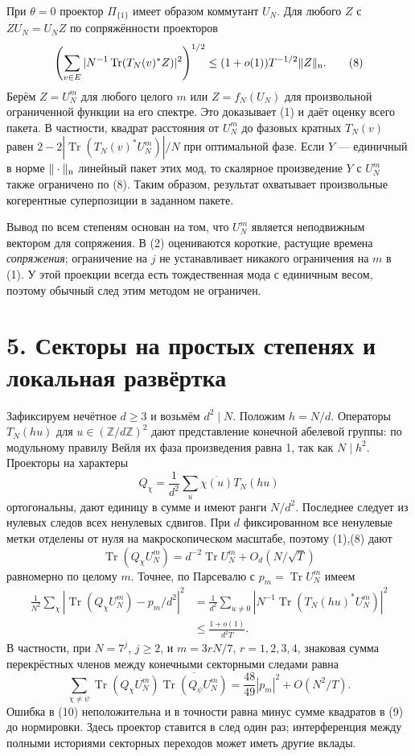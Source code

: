 \documentclass[11pt,a4paper]{article}
\newcommand{\Tr}{\operatorname{Tr}}
\newcommand{\Z}{\mathbb Z}
\newcommand{\sect}[1]{\section*{\sffamily\color{ink}#1}}
\begin{document}
При $\theta=0$ проектор $\Pi_{\{1\}}$ имеет образом коммутант $U_N$. Для любого $Z$ с $ZU_N=U_N Z$ по сопряжённости проекторов
\[
        \left(\sum_{v\in E}
               |N^{-1}\Tr(T_N(v)^*Z)|^2\right)^{1/2}
                          \le (1+o(1))T^{-1/2}\|Z\|_{\rm n}.        \tag{8}
\]
Берём $Z=U_N^m$ для любого целого $m$ или $Z=f_N(U_N)$ для произвольной ограниченной функции на его спектре. Это доказывает (1) и даёт оценку всего пакета. В частности, квадрат расстояния от $U_N^m$ до фазовых кратных $T_N(v)$ равен $2-2|\Tr(T_N(v)^*U_N^m)|/N$ при оптимальной фазе. Если $Y$ --- единичный в норме $\|\cdot\|_{\rm n}$ линейный пакет этих мод, то скалярное произведение $Y$ с $U_N^m$ также ограничено по (8). Таким образом, результат охватывает произвольные когерентные суперпозиции в заданном пакете.

Вывод по всем степеням основан на том, что $U_N^m$ является неподвижным вектором для сопряжения. В (2) оцениваются короткие, растущие времена \emph{сопряжения}; ограничение на $j$ не устанавливает никакого ограничения на $m$ в (1). У этой проекции всегда есть тождественная мода с единичным весом, поэтому обычный след этим методом не ограничен.
\newpage
\sect{5. Секторы на простых степенях и локальная развёртка}
Зафиксируем нечётное $d\ge3$ и возьмём $d^2\mid N$. Положим $h=N/d$. Операторы $T_N(hu)$ для $u\in(\Z/d\Z)^2$ дают представление конечной абелевой группы: по модульному правилу Вейля их фаза произведения равна 1, так как $N\mid h^2$. Проекторы на характеры
\[
             Q_\chi=\frac1{d^2}\sum_u \overline{\chi(u)} T_N(hu)
\]
ортогональны, дают единицу в сумме и имеют ранги $N/d^2$. Последнее следует из нулевых следов всех ненулевых сдвигов. При $d$ фиксированном все ненулевые метки отделены от нуля на макроскопическом масштабе, поэтому (1),(8) дают
\[
   \Tr(Q_\chi U_N^m)=d^{-2}\Tr U_N^m+O_d(N/\sqrt T)
\]
равномерно по целому $m$. Точнее, по Парсевалю с $p_m=\Tr U_N^m$ имеем
\[
 \begin{split}
    \frac1{N^2}\sum_\chi
          |\Tr(Q_\chi U_N^m)-p_m/d^2|^2
      &=\frac1{d^2}\sum_{u\ne0}
          |N^{-1}\Tr(T_N(hu)^*U_N^m)|^2 \\
      &\le\frac{1+o(1)}{d^2 T}.
 \end{split}                                                        \tag{9}
\]
В частности, при $N=7^j$, $j\ge2$, и $m=3rN/7$, $r=1,2,3,4$, знаковая сумма перекрёстных членов между конечными секторными следами равна
\[
       \sum_{\chi\ne\psi}\Tr(Q_\chi U_N^m)
                \overline{\Tr(Q_\psi U_N^m)}
                =\frac{48}{49}|p_m|^2+O(N^2/T).                     \tag{10}
\]
Ошибка в (10) неположительна и в точности равна минус сумме квадратов в (9) до нормировки. Здесь проектор ставится в след один раз; интерференция между полными историями секторных переходов может иметь другие вклады.
\end{document}
